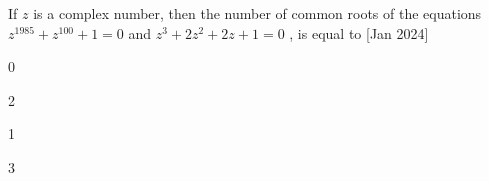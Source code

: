  \iffalse
  \title{2024}
  \author{EE24BTECH11010}
  \section{mcq-single}
\fi
 \item If $z$
 is a complex number, then the number of common roots of the equations $z^{1985} + z^{100} + 1 = 0 $ and $z^3 + 2z^2 + 2z + 1 = 0 $ 
, is equal to \hfill [Jan 2024]
\begin{enumerate}
    \begin{multicols}{2}
        \item 0
        \item 2
        \item 1
        \item 3
    \end{multicols}
\end{enumerate}

